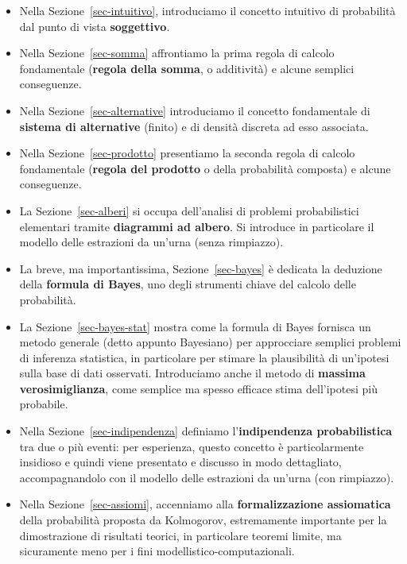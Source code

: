 \documentclass[
  italian,
  letterpaper,
]{book}
\theoremstyle{definition}
\theoremstyle{remark}
\begin{document}
\begin{itemize}
\item
  Nella Sezione~\ref{sec-intuitivo}, introduciamo il concetto intuitivo
  di probabilità dal punto di vista \textbf{soggettivo}.
\item
  Nella Sezione~\ref{sec-somma} affrontiamo la prima regola di calcolo
  fondamentale (\textbf{regola della somma}, o additività) e alcune
  semplici conseguenze.
\item
  Nella Sezione~\ref{sec-alternative} introduciamo il concetto
  fondamentale di \textbf{sistema di alternative} (finito) e di densità
  discreta ad esso associata.
\item
  Nella Sezione~\ref{sec-prodotto} presentiamo la seconda regola di
  calcolo fondamentale (\textbf{regola del prodotto} o della probabilità
  composta) e alcune conseguenze.
\item
  La Sezione~\ref{sec-alberi} si occupa dell'analisi di problemi
  probabilistici elementari tramite \textbf{diagrammi ad albero}. Si
  introduce in particolare il modello delle estrazioni da un'urna (senza
  rimpiazzo).
\item
  La breve, ma importantissima, Sezione~\ref{sec-bayes} è dedicata la
  deduzione della \textbf{formula di Bayes}, uno degli strumenti chiave
  del calcolo delle probabilità.
\item
  La Sezione~\ref{sec-bayes-stat} mostra come la formula di Bayes
  fornisca un metodo generale (detto appunto Bayesiano) per approcciare
  semplici problemi di inferenza statistica, in particolare per stimare
  la plausibilità di un'ipotesi sulla base di dati osservati.
  Introduciamo anche il metodo di \textbf{massima verosimiglianza}, come
  semplice ma spesso efficace stima dell'ipotesi più probabile.
\item
  Nella Sezione~\ref{sec-indipendenza} definiamo l'\textbf{indipendenza
  probabilistica} tra due o più eventi: per esperienza, questo concetto
  è particolarmente insidioso e quindi viene presentato e discusso in
  modo dettagliato, accompagnandolo con il modello delle estrazioni da
  un'urna (con rimpiazzo).
\item
  Nella Sezione~\ref{sec-assiomi}, accenniamo alla
  \textbf{formalizzazione assiomatica} della probabilità proposta da
  Kolmogorov, estremamente importante per la dimostrazione di risultati
  teorici, in particolare teoremi limite, ma sicuramente meno per i fini
  modellistico-computazionali.
\end{itemize}
\end{document}
